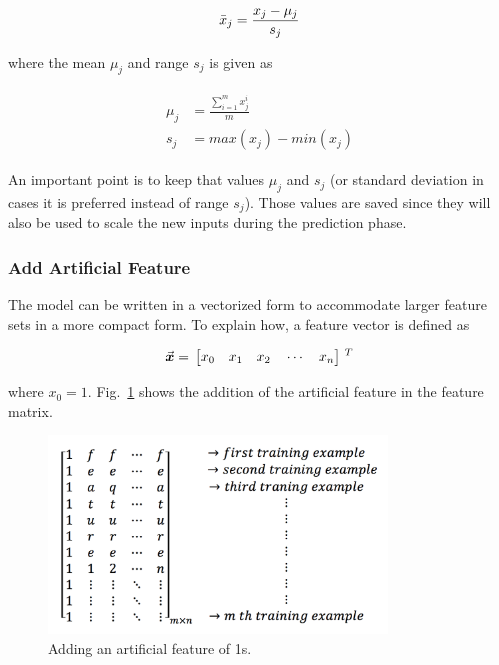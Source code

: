 \begin{equation}{\label{eqn:scalingFeatures}}
\bar{x}_j = \frac{x_j - \mu_j}{s_j} 
\end{equation} 

where the mean $\mu_j$ and range $s_j$ is given as

\begin{align}
\label{eqn:meandAndRange}
\begin{split}
\mu_j & = \frac{\sum\limits_{i=1}^m {x_j^i} }{m}
\\
s_j & = max(x_j) - min(x_j)
\end{split}
\end{align}

An important point is to keep that values $\mu_j$ and $s_j$ (or standard deviation in cases it is preferred instead of range $s_j$). 
Those values are saved since they will also be used to scale the new inputs during the prediction phase.

\subsubsection{Add Artificial Feature}

The model can be written in a vectorized form to accommodate larger feature sets in a more compact form.
To explain how, a feature vector is defined as

\begin{equation}{\label{eqn:featureVector}}
\vec{\bm{x}}
=\,
\begin{bmatrix}
x_0\quad x_1 \quad  x_2 \quad \cdots \quad x_n 
\end{bmatrix}
\,^T
\end{equation} 

where $x_0 = 1$. Fig.~\ref{fig:addArtificialFeature} shows the addition of the artificial feature in the feature matrix.

\begin{figure}
\begin{center}
\includegraphics[width=9cm]{figures/addArtificialFeature}    %
\caption{Adding an artificial feature of 1s.} 
\label{fig:addArtificialFeature}
\end{center}
\end{figure}


